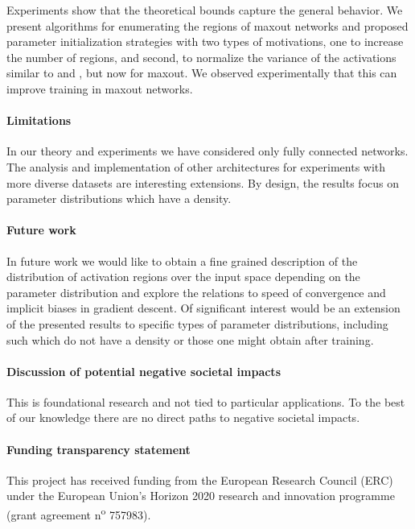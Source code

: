 \documentclass{article}
\theoremstyle{definition}
\begin{document}
Experiments show that the theoretical bounds capture the general behavior. We present algorithms for enumerating the regions of maxout networks and proposed parameter initialization strategies with two types of motivations, one to increase the number of regions, and second, to normalize the variance of the activations similar to \citet{glorot2010understanding} and \citet{he2015delving}, but now for maxout. We observed experimentally that this can improve training in maxout networks.

\paragraph{Limitations} In our theory and experiments we have considered only fully connected networks. 
The analysis and implementation of other architectures for experiments with more diverse datasets are interesting extensions.
By design, the results focus on parameter distributions which have a density.

\paragraph{Future work}
In future work we would like to obtain a fine grained description of the distribution of activation regions over the input space depending on the parameter distribution and explore the relations to speed of convergence and implicit biases in gradient descent.
Of significant interest would be an extension of the presented results to specific types of parameter distributions, including such which do not have a density or those one might obtain after training. 

\paragraph{Discussion of potential negative societal impacts} 
This is foundational research and not tied to particular applications. 
To the best of our knowledge there are no direct paths to negative societal impacts. 
 
\paragraph{Funding transparency statement}
 This project has received funding from the European Research Council (ERC) under the European Union’s Horizon 2020 research and innovation programme (grant agreement n\textsuperscript{o} 757983).  

\newpage 
{\small
    
    
}
\newpage
\end{document}
